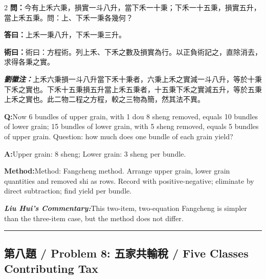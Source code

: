 \documentclass[11pt,a4paper]{article}
\newcommand{\cnwen}{\textcolor{cnlabelfg}{\textbf{問：}}}
\newcommand{\cnda}{\textbf{答曰：}}
\newcommand{\cnshu}{\textcolor{cnlabelfg}{\textbf{術曰：}}}
\newcommand{\cnzhu}{\textcolor{commentarycolor}{\textit{\textbf{劉徽注：}}}}
\newcommand{\enwen}{\textcolor{enlabelfg}{\textbf{Q:}}}
\newcommand{\enda}{\textcolor{enlabelfg}{\textbf{A:}}}
\newcommand{\enshu}{\textcolor{enlabelfg}{\textbf{Method:}}}
\newcommand{\enzhu}{\textcolor{enlabelfg}{\textit{\textbf{Liu Hui's Commentary:}}}}
\begin{document}
\begin{paracol}{2}
\switchcolumn[0]
\cnwen 今有上禾六秉，損實一斗八升，當下禾一十秉；下禾一十五秉，損實五升，當上禾五秉。問：上、下禾一秉各幾何？

\cnda 上禾一秉八升，下禾一秉三升。

\cnshu 術曰：方程術。列上禾、下禾之數及損實為行。以正負術記之，直除消去，求得各秉之實。

\cnzhu 上禾六秉損一斗八升當下禾十秉者，六秉上禾之實減一斗八升，等於十秉下禾之實也。下禾十五秉損五升當上禾五秉者，十五秉下禾之實減五升，等於五秉上禾之實也。此二物二程之方程，較之三物為簡，然其法不異。

\switchcolumn[1]
\enwen Now 6 bundles of upper grain, with 1 dou 8 sheng removed, equals 10 bundles of lower grain; 15 bundles of lower grain, with 5 sheng removed, equals 5 bundles of upper grain. Question: how much does one bundle of each grain yield?

\enda Upper grain: 8 sheng; Lower grain: 3 sheng per bundle.

\enshu Method: Fangcheng method. Arrange upper grain, lower grain quantities and removed shi as rows. Record with positive-negative; eliminate by direct subtraction; find yield per bundle.

\enzhu This two-item, two-equation Fangcheng is simpler than the three-item case, but the method does not differ.
\end{paracol}

\bigskip\hrule\bigskip

\subsection{第八題 / Problem 8: 五家共輸稅 / Five Classes Contributing Tax}
\end{document}
